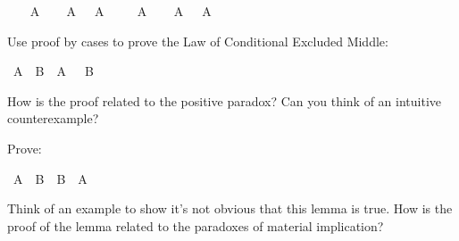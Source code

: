 \begin{isabellebody}
\ \ \isamarkupfalse%
\ {\isachardoublequoteopen}A{\isachardoublequoteclose}\isanewline
\ \ \isamarkupfalse%
\ {\isachardoublequoteopen}A\ {\isasymor}\ {\isasymnot}\ A{\isachardoublequoteclose}\isacommand{{\isachardot}{\isachardot}}\isamarkupfalse%
\isanewline
{}\isamarkupfalse%
\isanewline
\ \ \isamarkupfalse%
\ {\isachardoublequoteopen}{\isasymnot}\ A{\isachardoublequoteclose}\isanewline
\ \ \isamarkupfalse%
\ {\isachardoublequoteopen}A\ {\isasymor}\ {\isasymnot}\ A{\isachardoublequoteclose}\isacommand{{\isachardot}{\isachardot}}\isamarkupfalse%
\isanewline
{}\isamarkupfalse%
%
\endisatagproof
{\isafoldproof}%
%
\isadelimproof
%
\endisadelimproof
%
\begin{isamarkuptext}%
\begin{Exercise}[title = Conditional Excluded Middle] 
Use proof by cases to prove the Law of Conditional Excluded Middle: \end{Exercise}%
\end{isamarkuptext}\isamarkuptrue%
\isamarkupfalse%
\ {\isachardoublequoteopen}{\isacharparenleft}A\ {\isasymlongrightarrow}\ B{\isacharparenright}\ {\isasymor}\ {\isacharparenleft}A\ {\isasymlongrightarrow}\ {\isasymnot}\ B{\isacharparenright}{\isachardoublequoteclose}%
\isadelimproof
\ %
\endisadelimproof
%
\isatagproof
{}\isamarkupfalse%
%
\endisatagproof
{\isafoldproof}%
%
\isadelimproof
%
\endisadelimproof
%
\begin{isamarkuptext}%
How is the proof related to the positive paradox? Can you think of an intuitive counterexample?%
\end{isamarkuptext}\isamarkuptrue%
%
\begin{isamarkuptext}%
\begin{Exercise} Prove: \end{Exercise}%
\end{isamarkuptext}\isamarkuptrue%
\isamarkupfalse%
\ {\isachardoublequoteopen}{\isacharparenleft}A\ {\isasymlongrightarrow}\ B{\isacharparenright}\ {\isasymor}\ {\isacharparenleft}B\ {\isasymlongrightarrow}\ A{\isacharparenright}{\isachardoublequoteclose}%
\isadelimproof
\ %
\endisadelimproof
%
\isatagproof
{}\isamarkupfalse%
%
\endisatagproof
{\isafoldproof}%
%
\isadelimproof
%
\endisadelimproof
%
\begin{isamarkuptext}%
Think of an example to show it's not obvious that this lemma is true. How is the proof of
the lemma related to the paradoxes of material implication?%

\end{isamarkuptext}
\end{isabellebody}
